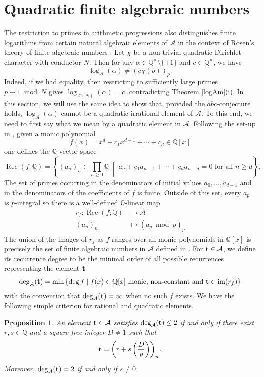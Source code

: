 \documentclass[12pt,reqno]{amsart}
\newtheorem{proposition}[theorem]{Proposition}
\theoremstyle{remark}
\newcommand{\cA}{\mathcal A}
\newcommand{\leg}[2]{\left(\frac{#1}{#2}\right)}
\DeclareMathOperator{\Rec}{Rec}
\DeclareMathOperator{\im}{im}
\begin{document}
\section{Quadratic finite algebraic numbers}
The restriction to primes in arithmetic progressions also distinguishes finite logarithms from certain natural algebraic elements of $\cA$ in the context of Rosen's theory of finite algebraic numbers \cite{Ro20}. Let $\chi$ be a non-trivial quadratic Dirichlet character with conductor $N$. Then 
for any $\alpha\in\mathbb{Q}^\times\setminus\{\pm 1\}$ and $c\in\mathbb{Q}^\times$, we have
\[\log_\cA(\alpha)\neq (c\chi(p))_p.\]
Indeed, if we had equality, then restricting to sufficiently large primes $p\equiv 1\bmod N$ gives $\log_{\cA(N)}(\alpha)=c$, contradicting Theorem \ref{logAm}(i). In this section, we will use the same idea to show that, provided the $abc$-conjecture holds, $\log_\cA(\alpha)$ cannot be a quadratic irrational element of $\cA$. 
To this end, we need to first say what we mean by a quadratic element in $\cA$. 
Following the set-up in \cite{RTTY24}, given a monic polynomial
\[f(x)=x^d+c_1x^{d-1}+\cdots +c_d\in\mathbb{Q}[x]\] 
one defines the $\mathbb{Q}$-vector space
\[\Rec(f;\mathbb{Q})=\left\{(a_n)_n\in\prod_{n\geq 0}\mathbb{Q}\; \middle|\; a_n+c_1a_{n-1}+\cdots+c_da_{n-d}=0
\text{ for all $n\geq d$}\right\}.\]
The set of primes occurring in the denominators of initial values $a_0,\dots,a_{d-1}$ and in the denominators of the coefficients of $f$ is finite. Outside of this set, every $a_p$ is $p$-integral so there is a well-defined $\mathbb{Q}$-linear map 
\begin{align*}
r_f:\Rec(f;\mathbb{Q})&\longrightarrow\cA \\
(a_n)_n&\longmapsto (a_p\bmod p)_p
\end{align*}
The union of the images of $r_f$ as $f$ ranges over all monic polynomials in $\mathbb{Q}[x]$ is precisely the set of finite algebraic numbers in $\cA$ defined in \cite{Ro20}. 
For ${\bf t}\in\cA$, we define its recurrence degree to be the minimal order of all possible recurrences representing the element ${\bf t}$ 
\[\deg_{\cA}({\bf t})=\min\left\{\deg f \;\middle|\; f(x)\in\mathbb{Q}[x]\text{ monic, non-constant and ${\bf t}\in\im(r_f)$}  \right\}\]
with the convention that $\deg_{\cA}({\bf t})=\infty$ when no such $f$ exists. 
We have the following simple criterion for rational and quadratic elements.
\begin{proposition}\label{quadinA}
An element ${\bf t}\in\cA$ satisfies $\deg_\cA({\bf t})\leq 2$ if and only if there exist $r,s\in\mathbb{Q}$ and a square-free integer $D\neq 1$ such that
\[{\bf t}=\left(r+s\leg{D}{p}\right)_p.\]
Moreover, $\deg_\cA({\bf t})=2$ if and only if $s\neq 0$.
\end{proposition}
\end{document}

